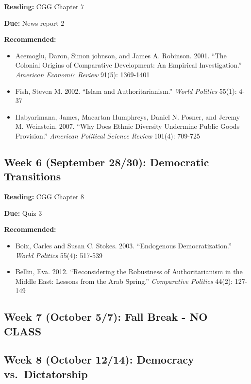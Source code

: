 \documentclass[
  11pt,
]{article}
\providecommand{\tightlist}{%
  \setlength{\itemsep}{0pt}\setlength{\parskip}{0pt}}
\begin{document}
\textbf{Reading:} CGG Chapter 7

\textbf{Due:} News report 2

\textbf{Recommended:}

\begin{itemize}
\tightlist
\item
  Acemoglu, Daron, Simon johnson, and James A. Robinson. 2001. ``The
  Colonial Origins of Comparative Development: An Empirical
  Investigation.'' \emph{American Economic Review} 91(5): 1369-1401
\item
  Fish, Steven M. 2002. ``Islam and Authoritarianism.'' \emph{World
  Politics} 55(1): 4-37
\item
  Habyarimana, James, Macartan Humphreys, Daniel N. Posner, and Jeremy
  M. Weinstein. 2007. ``Why Does Ethnic Diversity Undermine Public Goods
  Provision.'' \emph{American Political Science Review} 101(4): 709-725
\end{itemize}

\hypertarget{week-6-september-2830-democratic-transitions}{%
\subsection{Week 6 (September 28/30): Democratic
Transitions}\label{week-6-september-2830-democratic-transitions}}

\textbf{Reading:} CGG Chapter 8

\textbf{Due:} Quiz 3

\textbf{Recommended:}

\begin{itemize}
\tightlist
\item
  Boix, Carles and Susan C. Stokes. 2003. ``Endogenous
  Democratization.'' \emph{World Politics} 55(4): 517-539
\item
  Bellin, Eva. 2012. ``Reconsidering the Robustness of Authoritarianism
  in the Middle East: Lessons from the Arab Spring.'' \emph{Comparative
  Politics} 44(2): 127-149
\end{itemize}

\hypertarget{week-7-october-57-fall-break---no-class}{%
\subsection{Week 7 (October 5/7): Fall Break - NO
CLASS}\label{week-7-october-57-fall-break---no-class}}

\hypertarget{week-8-october-1214-democracy-vs.-dictatorship}{%
\subsection{Week 8 (October 12/14): Democracy
vs.~Dictatorship}\label{week-8-october-1214-democracy-vs.-dictatorship}}
\end{document}
